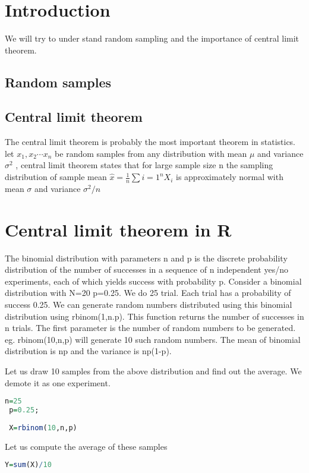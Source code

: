 \documentclass["../Applied_probabillity _and_statistics_lab_KTU.tex"]{subfiles}
\begin{document}
  \section{Introduction}
   We will try to under stand random sampling and the importance of central limit theorem.
   
   \subsection{Random samples}
   \subsection{Central limit theorem}
   The  central limit theorem is probably the most important theorem in statistics. let $x_1,x_2\cdots x_n$ be random samples from any distribution with mean $\mu$ and variance $\sigma ^2$ , central limit theorem states that  for large sample size n the sampling distribution of sample mean $\hat{x} = \frac{1}{n}\sum{i=1}^{n} X_i$ is approximately normal with mean $\sigma$ and variance $\sigma^2 / n$ 
   \section{Central limit theorem in R}
   The binomial distribution with parameters n and p is the discrete probability distribution of the number of successes in a sequence of n independent yes/no experiments, each of which yields success with probability p.
    Consider a binomial distribution with N=20 p=0.25. We do 25 trial. Each trial has a probability of success 0.25.
    We can generate random numbers distributed using this binomial distribution using 
    rbinom(1,n.p). This function returns the number of successes  in n trials.
    The first parameter is the number of random numbers to be generated. eg. rbinom(10,n,p) will generate 10 such random numbers. 
    The mean of binomial distribution is np and the variance is np(1-p). 
    
    Let us draw 10 samples from the above distribution and find out the average.  We demote it as one experiment.
    
     
\begin{lstlisting}[language=R]
 n=25
 p=0.25;
 
 X=rbinom(10,n,p)
\end{lstlisting}
 Let us compute the average of these samples
 \begin{lstlisting}[language=R]
 Y=sum(X)/10
\end{lstlisting}
\end{document}
